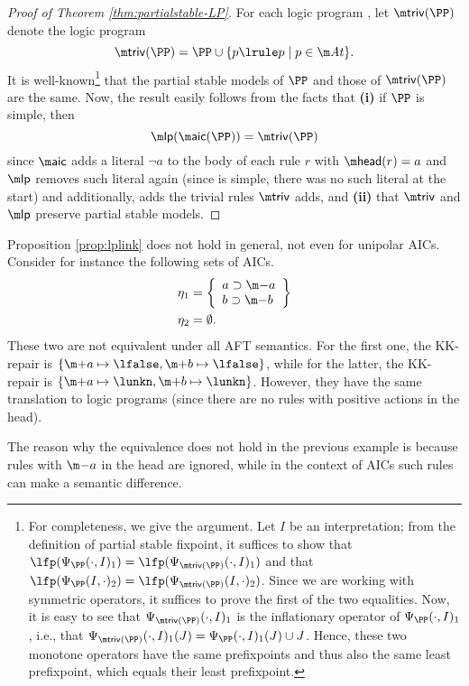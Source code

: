 \begin{proof}[Proof of Theorem \ref{thm:partialstable-LP}]
 For each logic program \PP, let $\triv(\PP)$ denote the logic program 
 \[
  \triv(\PP) = \PP \cup \{p\lrule p\mid p\in \atoms\}.
 \]
 It is well-known\footnote{For completeness, we give the argument. Let $I$ be an interpretation; from the definition of partial stable fixpoint, it suffices to show that 
 $\lfp(\Psi_\PP(\cdot,I)_1)= \lfp(\Psi_{\triv(\PP)}(\cdot,I)_1)$ and that 
  $\lfp(\Psi_\PP(I,\cdot)_2)= \lfp(\Psi_{\triv(\PP)}(I,\cdot)_2)$. Since we are working with symmetric operators, it suffices to prove the first of the two equalities. 
  Now, it is easy to see that $\Psi_{\triv(\PP)}(\cdot,I)_1$ is the inflationary operator of $\Psi_\PP(\cdot,I)_1$, i.e., that $\Psi_{\triv(\PP)}(\cdot,I)_1(J) = \Psi_\PP(\cdot,I)_1(J)\cup J$. Hence, these two monotone operators have the same prefixpoints and thus also the same least prefixpoint, which equals their least prefixpoint. 
  }
 that the partial stable models of $\PP$ and those of $\triv(\PP)$ are the same. 
 Now, the result easily follows from the facts that \textbf{(i)} if $\PP$ is simple, then
\[
\lpop(\aicop(\PP)) = \triv(\PP)\]
since $\aicop$ adds a literal $\lnot a$ to the body of each rule $r$ with $\head(r) = a$ and $\lpop$ removes such literal again (since \PP is simple, there was no such literal at the start) and additionally, adds the trivial rules $\triv$ adds, and \textbf{(ii)} 
 that $\triv$ and $\lpop$ preserve partial stable models. 
% 
\end{proof}


\begin{example}
 Proposition \ref{prop:lplink} does not hold in general, not even for unipolar AICs. 
 Consider for instance the following sets of AICs. 
 \begin{align*}\eta_1 &= \left\{\begin{array}{l}
                    a \aicrule \remove a\\
                     b  \aicrule \remove b
                   \end{array}\right\}\\
                   \eta_2 &=\emptyset.
\end{align*}
These two are not equivalent under all AFT semantics. 
For the first one, the KK-repair is $\{\add a\mapsto\lfalse,\add b\mapsto\lfalse\}$, while for the latter, the KK-repair is $\{\add a\mapsto\lunkn,\add b\mapsto\lunkn\}$. However, they have the same translation to logic programs (since there are no rules with positive actions in the head).          
%                    
% 
\end{example}

The reason why the equivalence does not hold in the previous example is because rules with $\remove a$ in the head are ignored, while in the context of AICs such rules can make a semantic difference. 

